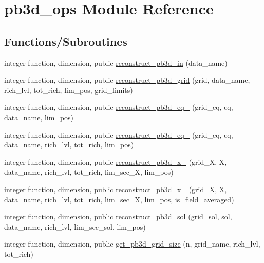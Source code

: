 \hypertarget{namespacepb3d__ops}{}\section{pb3d\+\_\+ops Module Reference}
\label{namespacepb3d__ops}
\subsection*{Functions/\+Subroutines}
\begin{DoxyCompactItemize}
\item 
integer function, dimension, public \hyperlink{namespacepb3d__ops_a057fc02a2d90e9ac8a7e5764d83fd1df}{reconstruct\+\_\+pb3d\+\_\+in} (data\+\_\+name)
\item 
integer function, dimension, public \hyperlink{namespacepb3d__ops_a279af758fa95e678f6485c50e5bc4ffb}{reconstruct\+\_\+pb3d\+\_\+grid} (grid, data\+\_\+name, rich\+\_\+lvl, tot\+\_\+rich, lim\+\_\+pos, grid\+\_\+limits)
\item 
integer function, dimension, public \hyperlink{namespacepb3d__ops_a248d51dc98b7de287499ba3a4e6c1eaa}{reconstruct\+\_\+pb3d\+\_\+eq\+\_} (grid\+\_\+eq, eq, data\+\_\+name, lim\+\_\+pos)
\item 
integer function, dimension, public \hyperlink{namespacepb3d__ops_a13280910f320a6835cd19e62fe238240}{reconstruct\+\_\+pb3d\+\_\+eq\+\_} (grid\+\_\+eq, eq, data\+\_\+name, rich\+\_\+lvl, tot\+\_\+rich, lim\+\_\+pos)
\item 
integer function, dimension, public \hyperlink{namespacepb3d__ops_ababe805fcaaca1486c74ad7a8aecfb7e}{reconstruct\+\_\+pb3d\+\_\+x\+\_} (grid\+\_\+X, X, data\+\_\+name, rich\+\_\+lvl, tot\+\_\+rich, lim\+\_\+sec\+\_\+X, lim\+\_\+pos)
\item 
integer function, dimension, public \hyperlink{namespacepb3d__ops_a50f211992fbe20a56749b2be81a521e6}{reconstruct\+\_\+pb3d\+\_\+x\+\_} (grid\+\_\+X, X, data\+\_\+name, rich\+\_\+lvl, tot\+\_\+rich, lim\+\_\+sec\+\_\+X, lim\+\_\+pos, is\+\_\+field\+\_\+averaged)
\item 
integer function, dimension, public \hyperlink{namespacepb3d__ops_a418960ddc3c8c0ec6ac0af970feedbe2}{reconstruct\+\_\+pb3d\+\_\+sol} (grid\+\_\+sol, sol, data\+\_\+name, rich\+\_\+lvl, lim\+\_\+sec\+\_\+sol, lim\+\_\+pos)
\item 
integer function, dimension, public \hyperlink{namespacepb3d__ops_a0bd4c4c24d7cbd1494b31ea993946433}{get\+\_\+pb3d\+\_\+grid\+\_\+size} (n, grid\+\_\+name, rich\+\_\+lvl, tot\+\_\+rich)
\end{DoxyCompactItemize}


